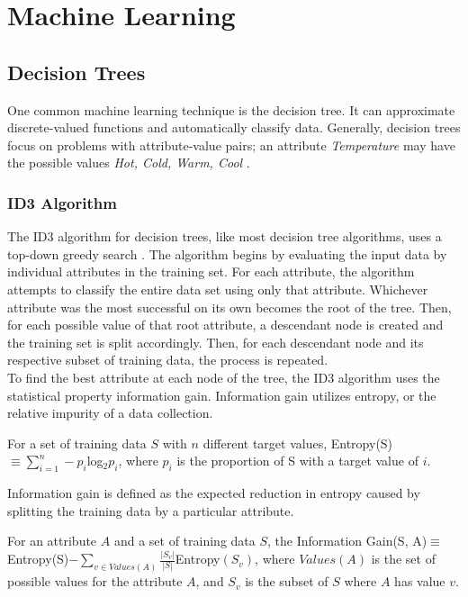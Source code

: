 \chapter{Machine Learning}
\section{Decision Trees}
One common machine learning technique is the decision tree. It can approximate discrete-valued functions \cite{mitc97} and automatically classify data\cite{sega07}. Generally, decision trees focus on problems with attribute-value pairs; an attribute \textit{Temperature} may have the possible values \textit{ Hot, Cold, Warm, Cool} \cite{mitc97}.

\subsection{ID3 Algorithm}
The ID3 algorithm for decision trees, like most decision tree algorithms, uses a top-down greedy search \cite{mitc97}. The algorithm begins by evaluating the input data by individual attributes in the training set. For each attribute, the algorithm attempts to classify the entire data set using only that attribute. Whichever attribute was the most successful on its own becomes the root of the tree. Then, for each possible value of that root attribute, a descendant node is created and the training set is split accordingly. Then, for each descendant node and its respective subset of training data, the process is repeated.\\

To find the best attribute at each node of the tree, the ID3 algorithm uses the statistical property information gain. Information gain utilizes entropy, or the relative impurity of a data collection.
\begin{define}
  For a set of training data $S$ with $n$ different target values, Entropy(S)$\equiv\sum_{i=1}^n-p_i$log$_2p_i$, where $p_i$ is the proportion of S with a target value of $i$.
\end{define}
Information gain is defined as the expected reduction in entropy caused by splitting the training data by a particular attribute.
\begin{define}
  For an attribute $A$ and a set of training data $S$, the Information Gain(S, A)$\equiv$Entropy(S)$-\sum_{v\in Values(A)}\frac{|S_v|}{|S|}$Entropy$(S_v)$, where $Values(A)$ is the set of possible values for the attribute $A$, and $S_v$ is the subset of $S$ where $A$ has value $v$.
\end{define}